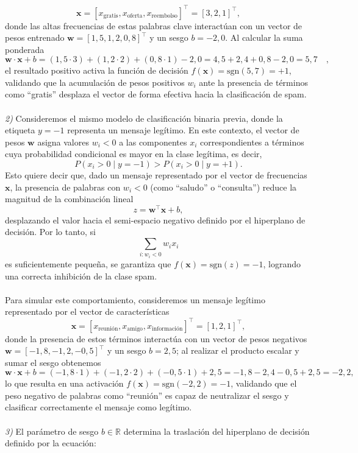 \documentclass{article}
\begin{document}
\[\mathbf{x} = [x_{\text{gratis}}, x_{\text{oferta}}, x_{\text{reembolso}}]^\top = [3, 2, 1]^\top,\] donde las altas frecuencias de estas palabras clave interactúan con un vector de pesos entrenado
$\mathbf{w} = [1,5, 1,2, 0,8]^\top$ y un sesgo
$b = -2,0$. Al calcular la suma ponderada
\[\mathbf{w} \cdot \mathbf{x} + b = (1,5 \cdot 3) + (1,2 \cdot 2) + (0,8 \cdot 1) - 2,0 = 4,5 + 2,4 + 0,8 - 2,0 = 5,7 \quad ,\] el resultado positivo activa la función de decisión
$f(\mathbf{x}) = \text{sgn}(5,7) = +1$, validando que la acumulación de pesos positivos
$w_i$ ante la presencia de términos como “gratis” desplaza el vector de forma efectiva hacia la clasificación de spam. \\ \\
\textit{2)} Consideremos el mismo modelo de clasificación binaria previa, donde la etiqueta $y = -1$ representa un mensaje legítimo. En este contexto, el vector de pesos $\mathbf{w}$ asigna valores $w_i < 0$ a las componentes $x_i$ correspondientes a términos cuya probabilidad condicional es mayor en la clase legítima, es decir,
\[P(x_i > 0 \mid y = -1) > P(x_i > 0 \mid y = +1).\] Esto quiere decir que, dado un mensaje representado por el vector de frecuencias $\mathbf{x}$, la presencia de palabras con $w_i < 0$ (como “saludo” o “consulta”) reduce la magnitud de la combinación lineal \[z = \mathbf{w}^\top \mathbf{x} + b,\] desplazando el valor hacia el semi-espacio negativo definido por el hiperplano de decisión. Por lo tanto, si
\[\sum_{i: w_i < 0} w_i x_i\] es suficientemente pequeña, se garantiza que
$f(\mathbf{x}) = \text{sgn}(z) = -1$, logrando una correcta inhibición de la clase spam. \\ \\
Para simular este comportamiento, consideremos un mensaje legítimo representado por el vector de características \[\mathbf{x} = [x_{\text{reunión}}, x_{\text{amigo}}, x_{\text{información}}]^\top = [1, 2, 1]^\top,\] donde la presencia de estos términos interactúa con un vector de pesos negativos $\mathbf{w} = [-1,8, -1,2, -0,5]^\top$ y un sesgo $b = 2,5$; al realizar el producto escalar y sumar el sesgo obtenemos \[\mathbf{w} \cdot \mathbf{x} + b = (-1,8 \cdot 1) + (-1,2 \cdot 2) + (-0,5 \cdot 1) + 2,5 = -1,8 - 2,4 - 0,5 + 2,5 = -2,2,\] lo que resulta en una activación $f(\mathbf{x}) = \text{sgn}(-2,2) = -1$, validando que el peso negativo de palabras como ``reunión'' es capaz de neutralizar el sesgo y clasificar correctamente el mensaje como legítimo. \\ \\
\textit{3)} El parámetro de sesgo $b \in \mathbb{R}$ determina la traslación del hiperplano de decisión definido por la ecuación:
\end{document}
